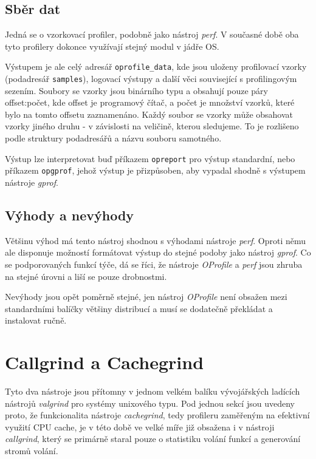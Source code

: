 \documentclass[czech,BP]{thesiskiv}
\begin{document}
\subsection*{Sběr dat}

Jedná se o vzorkovací profiler, podobně jako nástroj \emph{perf}. V současné době oba tyto profilery dokonce využívají stejný modul v jádře OS.

Výstupem je ale celý adresář \texttt{oprofile\_data}, kde jsou uloženy profilovací vzorky (podadresář \texttt{samples}), logovací výstupy a další věci související s profilingovým sezením. Soubory se vzorky jsou binárního typu a obsahují pouze páry offset:počet, kde offset je programový čítač, a počet je množství vzorků, které bylo na tomto offsetu zaznamenáno. Každý soubor se vzorky může obsahovat vzorky jiného druhu - v závislosti na veličině, kterou sledujeme. To je rozlišeno podle struktury podadresářů a názvu souboru samotného.

Výstup lze interpretovat buď příkazem \texttt{opreport} pro výstup standardní, nebo příkazem \texttt{opgprof}, jehož výstup je přizpůsoben, aby vypadal shodně s výstupem nástroje \emph{gprof}.

\subsection*{Výhody a nevýhody}

Většinu výhod má tento nástroj shodnou s výhodami nástroje \emph{perf}. Oproti němu ale disponuje možností formátovat výstup do stejné podoby jako nástroj \emph{gprof}. Co se podporovaných funkcí týče, dá se říci, že nástroje \emph{OProfile} a \emph{perf} jsou zhruba na stejné úrovni a liší se pouze drobnostmi.

Nevýhody jsou opět poměrně stejné, jen nástroj \emph{OProfile} není obsažen mezi standardními balíčky většiny distribucí a musí se dodatečně překládat a instalovat ručně.




\section{Callgrind a Cachegrind}

Tyto dva nástroje jsou přítomny v jednom velkém balíku vývojářských ladících nástrojů \emph{valgrind} pro systémy unixového typu. Pod jednou sekcí jsou uvedeny proto, že funkcionalita nástroje \emph{cachegrind}, tedy profileru zaměřeným na efektivní využití CPU cache, je v této době ve velké míře již obsažena i v nástroji \emph{callgrind}, který se primárně staral pouze o statistiku volání funkcí a generování stromů volání.
\end{document}
